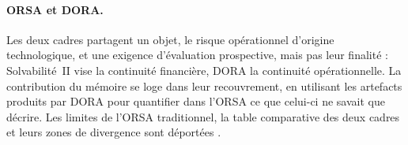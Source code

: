 

\paragraph{ORSA et DORA.} Les deux cadres partagent un objet, le risque opérationnel d'origine
technologique, et une exigence d'évaluation prospective, mais pas leur finalité : Solvabilité~II
vise la continuité financière, DORA la continuité opérationnelle. La contribution du mémoire se
loge dans leur recouvrement, en utilisant les artefacts produits par DORA pour quantifier dans
l'ORSA ce que celui-ci ne savait que décrire. Les limites de l'ORSA traditionnel, la table
comparative des deux cadres et leurs zones de divergence sont déportées \matcomp.


